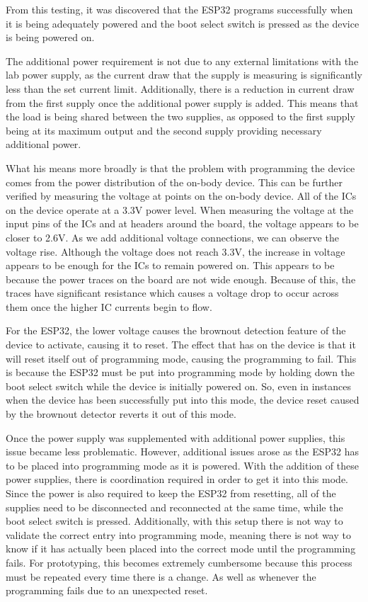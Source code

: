 From this testing, it was discovered that the ESP32 programs successfully when it is being adequately powered
and the boot select switch is pressed as the device is being powered on.

The additional power requirement is not due to any external limitations with the lab power supply,
as the current draw that the supply is measuring is significantly less than the set current limit.
Additionally, there is a reduction in current draw from the first supply once the additional power supply is added.
This means that the load is being shared between the two supplies,
as opposed to the first supply being at its maximum output and the second supply providing necessary additional power.

What his means more broadly is that the problem with programming the device comes from the power distribution of the on-body device.
This can be further verified by measuring the voltage at points on the on-body device.
All of the ICs on the device operate at a 3.3V power level.
When measuring the voltage at the input pins of the ICs and at headers around the board, the voltage appears to be closer to 2.6V.
As we add additional voltage connections, we can observe the voltage rise.
Although the voltage does not reach 3.3V, the increase in voltage appears to be enough for the ICs to remain powered on.
This appears to be because the power traces on the board are not wide enough.
Because of this, the traces have significant resistance which causes a voltage drop to occur across them once the higher IC currents begin to flow.

For the ESP32, the lower voltage causes the brownout detection feature of the device to activate, causing it to reset.
The effect that has on the device is that it will reset itself out of programming mode, causing the programming to fail.
This is because the ESP32 must be put into programming mode by holding down the boot select switch while the device is initially powered on.
So, even in instances when the device has been successfully put into this mode,
the device reset caused by the brownout detector reverts it out of this mode.

Once the power supply was supplemented with additional power supplies, this issue became less problematic.
However, additional issues arose as the ESP32 has to be placed into programming mode as it is powered.
With the addition of these power supplies, there is coordination required in order to get it into this mode.
Since the power is also required to keep the ESP32 from resetting, all of the supplies need to be disconnected and reconnected at the same time,
while the boot select switch is pressed.
Additionally, with this setup there is not way to validate the correct entry into programming mode,
meaning there is not way to know if it has actually been placed into the correct mode until the programming fails.
For prototyping, this becomes extremely cumbersome because this process must be repeated every time there is a change.
As well as whenever the programming fails due to an unexpected reset.

